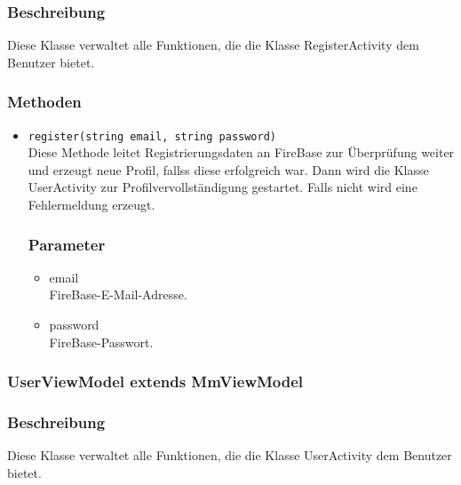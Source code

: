 \documentclass[a4paper]{scrreprt}
\begin{document}
\subsubsection*{Beschreibung}
Diese Klasse verwaltet alle Funktionen, die die Klasse RegisterActivity dem Benutzer bietet.
\subsubsection*{Methoden}
\begin{addmargin}[25pt]{0pt}
\begin{itemize}

\item \texttt{register(string email, string password)}\\
	Diese Methode leitet Registrierungsdaten an FireBase zur Überprüfung weiter und erzeugt neue Profil, fallss diese erfolgreich war. Dann wird die Klasse UserActivity zur Profilvervollständigung gestartet. Falls nicht wird eine Fehlermeldung erzeugt.

	\subsubsection*{Parameter}
	\begin{itemize}
	\item email \\
		FireBase-E-Mail-Adresse.
	\item password \\
		FireBase-Passwort.
	\end{itemize}

\end{itemize}
\end{addmargin}	


\subsubsection{UserViewModel extends MmViewModel}
\subsubsection*{Beschreibung}
Diese Klasse verwaltet alle Funktionen, die die Klasse UserActivity dem Benutzer bietet.
\end{document}
